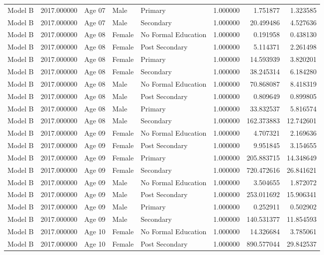 \begin{table}[ht]
\begin{tabular}{lrlllrrr}
Model B & 2017.000000 & Age 07 & Male & Primary & 1.000000 & 1.751877 & 1.323585 \\
Model B & 2017.000000 & Age 07 & Male & Secondary & 1.000000 & 20.499486 & 4.527636 \\
Model B & 2017.000000 & Age 08 & Female & No Formal Education & 1.000000 & 0.191958 & 0.438130 \\
Model B & 2017.000000 & Age 08 & Female & Post Secondary & 1.000000 & 5.114371 & 2.261498 \\
Model B & 2017.000000 & Age 08 & Female & Primary & 1.000000 & 14.593939 & 3.820201 \\
Model B & 2017.000000 & Age 08 & Female & Secondary & 1.000000 & 38.245314 & 6.184280 \\
Model B & 2017.000000 & Age 08 & Male & No Formal Education & 1.000000 & 70.868087 & 8.418319 \\
Model B & 2017.000000 & Age 08 & Male & Post Secondary & 1.000000 & 0.809649 & 0.899805 \\
Model B & 2017.000000 & Age 08 & Male & Primary & 1.000000 & 33.832537 & 5.816574 \\
Model B & 2017.000000 & Age 08 & Male & Secondary & 1.000000 & 162.373883 & 12.742601 \\
Model B & 2017.000000 & Age 09 & Female & No Formal Education & 1.000000 & 4.707321 & 2.169636 \\
Model B & 2017.000000 & Age 09 & Female & Post Secondary & 1.000000 & 9.951845 & 3.154655 \\
Model B & 2017.000000 & Age 09 & Female & Primary & 1.000000 & 205.883715 & 14.348649 \\
Model B & 2017.000000 & Age 09 & Female & Secondary & 1.000000 & 720.472616 & 26.841621 \\
Model B & 2017.000000 & Age 09 & Male & No Formal Education & 1.000000 & 3.504655 & 1.872072 \\
Model B & 2017.000000 & Age 09 & Male & Post Secondary & 1.000000 & 253.011692 & 15.906341 \\
Model B & 2017.000000 & Age 09 & Male & Primary & 1.000000 & 0.252911 & 0.502902 \\
Model B & 2017.000000 & Age 09 & Male & Secondary & 1.000000 & 140.531377 & 11.854593 \\
Model B & 2017.000000 & Age 10 & Female & No Formal Education & 1.000000 & 14.326684 & 3.785061 \\
Model B & 2017.000000 & Age 10 & Female & Post Secondary & 1.000000 & 890.577044 & 29.842537 \\

\end{tabular}
\end{table}
